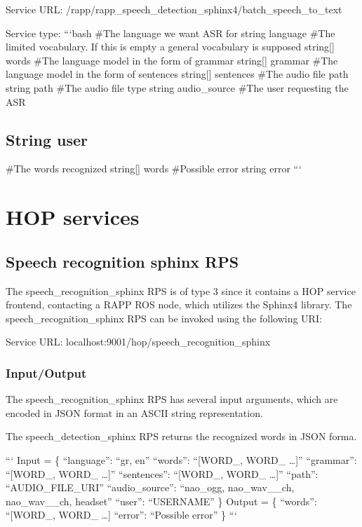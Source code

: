 Service U\-R\-L\-: {\ttfamily /rapp/rapp\-\_\-speech\-\_\-detection\-\_\-sphinx4/batch\-\_\-speech\-\_\-to\-\_\-text}

Service type\-: ```bash \#\-The language we want A\-S\-R for string language \#\-The limited vocabulary. If this is empty a general vocabulary is supposed string\mbox{[}\mbox{]} words \#\-The language model in the form of grammar string\mbox{[}\mbox{]} grammar \#\-The language model in the form of sentences string\mbox{[}\mbox{]} sentences \#\-The audio file path string path \#\-The audio file type string audio\-\_\-source \#\-The user requesting the A\-S\-R \subsection*{String user }

\#\-The words recognized string\mbox{[}\mbox{]} words \#\-Possible error string error ```

\section*{H\-O\-P services}

\subsection*{Speech recognition sphinx R\-P\-S}

The speech\-\_\-recognition\-\_\-sphinx R\-P\-S is of type 3 since it contains a H\-O\-P service frontend, contacting a R\-A\-P\-P R\-O\-S node, which utilizes the Sphinx4 library. The speech\-\_\-recognition\-\_\-sphinx R\-P\-S can be invoked using the following U\-R\-I\-:

Service U\-R\-L\-: {\ttfamily localhost\-:9001/hop/speech\-\_\-recognition\-\_\-sphinx}

\subsubsection*{Input/\-Output}

The speech\-\_\-recognition\-\_\-sphinx R\-P\-S has several input arguments, which are encoded in J\-S\-O\-N format in an A\-S\-C\-I\-I string representation.

The speech\-\_\-detection\-\_\-sphinx R\-P\-S returns the recognized words in J\-S\-O\-N forma.

``` Input = \{ “language”\-: “gr, en” “words”\-: “\mbox{[}W\-O\-R\-D\-\_, W\-O\-R\-D\-\_ …\mbox{]}” “grammar”\-: “\mbox{[}W\-O\-R\-D\-\_, W\-O\-R\-D\-\_ …\mbox{]}” “sentences”\-: “\mbox{[}W\-O\-R\-D\-\_, W\-O\-R\-D\-\_ …\mbox{]}” “path”\-: “\-A\-U\-D\-I\-O\-\_\-\-F\-I\-L\-E\-\_\-\-U\-R\-I” “audio\-\_\-source”\-: “nao\-\_\-ogg, nao\-\_\-wav\-\_\-\_\-ch, nao\-\_\-wav\-\_\-\_\-ch, headset” “user”\-: “\-U\-S\-E\-R\-N\-A\-M\-E” \} {\ttfamily  } Output = \{ “words”\-: “\mbox{[}W\-O\-R\-D\-\_, W\-O\-R\-D\-\_ …\mbox{]} “error”\-: “\-Possible error” \} ```


